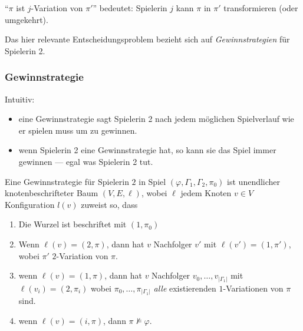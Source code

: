 \enquote{$\pi$ ist $j$-Variation von $\pi'$} bedeutet: Spielerin $j$ kann
$\pi$ in $\pi'$ transformieren (oder umgekehrt).

Das hier relevante Entscheidungsproblem bezieht sich auf \emph{Gewinnstrategien} für Spielerin 2.

\subsubsection{Gewinnstrategie}\label{definition-5.8-gewinnstrategie}

Intuitiv:

\begin{itemize}
  \item eine Gewinnstrategie sagt Spielerin 2 nach jedem möglichen Spielverlauf wie er spielen muss um zu gewinnen.
  \item wenn Spielerin 2 eine Gewinnstrategie hat, so kann sie das Spiel immer gewinnen --- egal was Spielerin 2 tut.
\end{itemize}

\begin{definition}[Gewinnstrategie]

Eine  Gewinnstrategie für Spielerin $2$ in Spiel
$\left( \varphi,\Gamma_1,\Gamma_2,\pi_{0} \right)$ ist unendlicher
knotenbeschrifteter Baum $(V,E,\ell)$, wobei $\ell$ jedem Knoten
$v \in V$ Konfiguration $l(v)$ zuweist so, dass

\begin{enumerate}[label={(\alph*)}]
\item Die Wurzel ist beschriftet mit $\left( 1,\pi_{0} \right)$
\item Wenn $\ell\left( v \right) = (2,\pi)$, dann hat $v$ Nachfolger
  $v'$ mit $\ell\left( v' \right) = \left( 1,\pi' \right)$, wobei
  $\pi'$ $2$-Variation von $\pi$.
\item wenn $\ell\left( v \right) = (1,\pi)$, dann hat $v$ Nachfolger
  $v_{0},\ldots,v_{\left| \Gamma_1 \right|}$ mit
  $\ell\left( v_i \right) = (2,\pi_{i})$ wobei
  $\pi_{0},\ldots,\pi_{\left| \Gamma_1 \right|}$ \emph{alle} existierenden
  $1$-Variationen von $\pi$ sind.
\item wenn $\ell\left( v \right) = (i,\pi)$, dann
  $\pi \not\models \varphi$.
\end{enumerate}
\end{definition}

